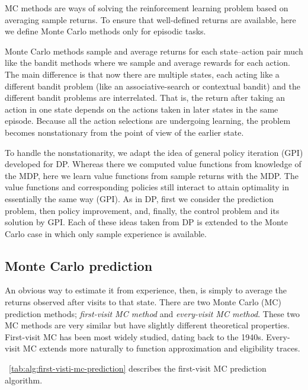 MC methods are ways of solving the reinforcement learning problem based on averaging sample returns.
To ensure that well-defined returns are available, here we define Monte Carlo methods only for episodic tasks.

Monte Carlo methods sample and average returns for each state–action pair much like the bandit methods
where we sample and average rewards for each action.
The main difference is that now there are multiple states,
each acting like a different bandit problem (like an associative-search or contextual bandit)
and the different bandit problems are interrelated.
That is, the return after taking an action in one state depends on the actions taken in later states in the same episode.
Because all the action selections are undergoing learning, the problem becomes nonstationary from the point of view of the earlier state.


To handle the nonstationarity,
we adapt the idea of general policy iteration (GPI) developed for DP.
Whereas there we computed value functions from knowledge of the MDP,
here we learn value functions from sample returns with the MDP.
The value functions and corresponding policies still interact to attain optimality
in essentially the same way (GPI).
As in DP,
first we consider the prediction problem, then policy improvement, and, finally,
the control problem and its solution by GPI.
Each of these ideas taken from DP is extended to the Monte Carlo case in which only sample experience is available.


\subsection{Monte Carlo prediction}

An obvious way to estimate it from experience, then, is simply to average the returns observed after visits to that state.
There are two Monte Carlo (MC) prediction methods; \emph{first-visit MC method} and \emph{every-visit MC method}.
These two MC methods are very similar but have slightly different theoretical properties.
First-visit MC has been most widely studied, dating back to the 1940s.
Every-visit MC extends more naturally to function approximation and eligibility traces.

\tablename~\ref{tab:alg:first-visti-mc-prediction} describes the first-visit MC prediction algorithm.


